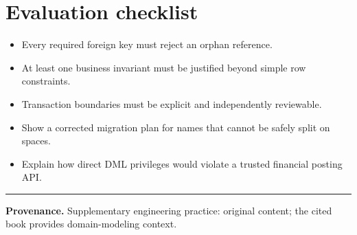 \documentclass[11pt,letterpaper]{article}
\begin{document}
\section{Evaluation checklist}
\begin{itemize}
\item Every required foreign key must reject an orphan reference.
\item At least one business invariant must be justified beyond simple row constraints.
\item Transaction boundaries must be explicit and independently reviewable.
\item Show a corrected migration plan for names that cannot be safely split on spaces.
\item Explain how direct DML privileges would violate a trusted financial posting API.
\end{itemize}

\vfill
\hrule
{\footnotesize\textbf{Provenance.} Supplementary engineering practice: original content; the cited book provides domain-modeling context.}
\end{document}
